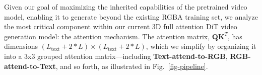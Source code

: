 




Given our goal of maximizing the inherited capabilities of the pretrained video model, enabling it to generate beyond the existing RGBA training set, we analyze the most critical component within our current 3D full attention DiT video generation model: the attention mechanism.
%
The attention matrix, \(\mathbf{Q}\mathbf{K}^T\), has dimensions \((L_\text{text} + 2*L) \times (L_\text{text} + 2*L)\), which we simplify by organizing it into a 3x3 grouped attention matrix—including \textbf{Text-attend-to-RGB}, \textbf{RGB-attend-to-Text}, and so forth, as illustrated in Fig.~\ref{fig-pipeline}. %

